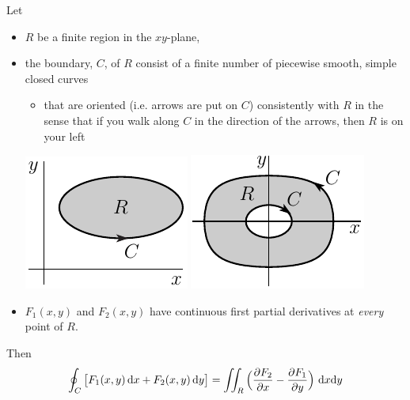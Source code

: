 \begin{theorem}\label{thm:Green}
Let 
\begin{itemize}\itemsep1pt \parskip0pt  %
\item
$R$ be a finite region in the $xy$-plane,
\item
the boundary, $C$, of $R$ consist of a finite number of piecewise smooth, simple closed curves 
    \begin{itemize}\itemsep1pt \parskip0pt  %
     \item
     that are oriented (i.e. arrows are put on $C$) consistently 
     with $R$ in the sense that if you walk along
     $C$ in the direction of the arrows, then $R$ is on your left
    \end{itemize}
     \begin{efig}
     \begin{center}
        \includegraphics{greens1.pdf}\qquad
        \includegraphics{dcircleE.pdf}
    \end{center}
    \end{efig}
\item
$F_1(x,y)$ and $F_2(x,y)$ have continuous first partial derivatives 
at \emph{every} point of $R$.
\end{itemize}
Then
\begin{equation*}
\oint_{C} \big[F_1(x,y)\,\dee{x} +F_2(x,y)\,\dee{y}\big]
 =\dblInt_{R}\Big(\frac{\partial F_2}{\partial x} 
                - \frac{\partial F_1}{\partial y}\Big)\ \dee{x}\dee{y}
\end{equation*}
\end{theorem}


